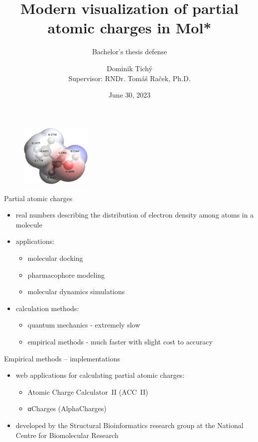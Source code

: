 \documentclass[
]{beamer}
\title[Visualization of partial charges in Mol*]{Modern visualization of partial atomic charges in Mol*}
\subtitle[Short Presentation Subtitle]{Bachelor's thesis defense}
\author[D. Tichý]{Dominik Tichý\texorpdfstring{\\}{, }Supervisor: RNDr. Tomáš Raček, Ph.D.}
\institute[FI MU]{Faculty of Informatics, Masaryk University}
\date{June 30, 2023}
\begin{document}
\begin{frame}[plain]
  \maketitle
\end{frame}

\begin{figure}
  \vspace{55pt}
  \hspace{45pt}
  \includegraphics[height=3cm]{images/charges-numbers.png}
\end{figure}

\begin{frame}{Partial atomic charges}
  \begin{itemize}
    \item real numbers describing the distribution of electron density among atoms in a molecule
    \item applications:
    \begin{itemize}
      \item molecular docking
      \item pharmacophore modeling
      \item molecular dynamics simulations
    \end{itemize}
      \item calculation methods:
    \begin{itemize}
      \item quantum mechanics - extremely slow
      \item empirical methods - much faster with slight cost to accuracy
    \end{itemize}
  \end{itemize}
\end{frame}

\begin{frame}{Empirical methods -- implementations}
  \begin{itemize}
    \item web applications for calculating partial atomic charges:
    \begin{itemize}
      \item Atomic Charge Calculator~II (ACC~II) 
      \item αCharges (AlphaCharges) 
    \end{itemize}
    \item developed by the Structural Bioinformatics research group at the National Centre for Biomolecular Research 
  \end{itemize}
\end{frame}
\end{document}
